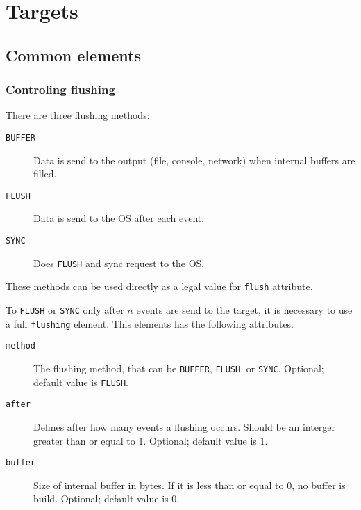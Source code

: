 
\section{Targets}

\subsection{Common elements}\label{target.common}

\subsubsection{Controling flushing}\label{target.common.flushing}
There are three flushing methods:
\begin{description}
  \item[{\tt BUFFER}]
    Data is send to the output (file, console, network) when internal
    buffers are filled.
  \item[{\tt FLUSH}]
    Data is send to the OS after each event.
  \item[{\tt SYNC}]
    Does {\tt FLUSH} and sync request to the OS.
\end{description}
These methods can be used directly as a legal value for {\tt flush}
attribute.

To {\tt FLUSH} or {\tt SYNC} only after $n$ events are send to the
target, it is necessary to use a full {\tt flushing} element.
This elements has the following attributes:
\begin{description}
  \item[{\tt method}]
    The flushing method, that can be {\tt BUFFER}, {\tt FLUSH}, or
    {\tt SYNC}.
    Optional; default value is {\tt FLUSH}.
  \item[{\tt after}]
    Defines after how many events a flushing occurs.
    Should be an interger greater than or equal to 1.
    Optional; default value is 1.    
  \item[{\tt buffer}]
    Size of internal buffer in bytes.
    If it is less than or equal to 0, no buffer is build.
    Optional; default value is 0.
\end{description}

